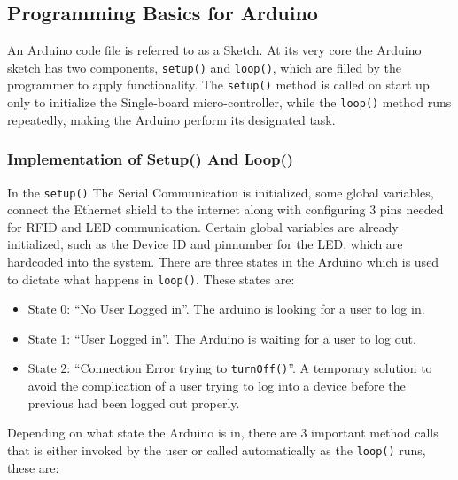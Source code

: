 \subsection{Programming Basics for Arduino}
\label{ProgrammingBasicsforArduino}

An Arduino code file is referred to as a Sketch. At its very core the Arduino sketch has two components, \verb|setup()| and \verb|loop()|, which are filled by the programmer to apply functionality.
The \verb|setup()| method is called on start up only to initialize the Single-board micro-controller, while the \verb|loop()| method runs repeatedly, making the Arduino perform its designated task.

\subsubsection*{Implementation of Setup() And Loop()}
In the \verb|setup()| The Serial Communication is initialized, some global variables, connect the Ethernet shield to the internet along with configuring 3 pins needed for RFID and LED communication. Certain global variables are already initialized, such as the Device ID and pinnumber for the LED, which are hardcoded into the system.\newline
There are three states in the Arduino which is used to dictate what happens in \verb|loop()|. These states are:
\begin{itemize}
	\item State 0: ``No User Logged in''. The arduino is looking for a user to log in.
	\item State 1: ``User Logged in''. The Arduino is waiting for a user to log out.
	\item State 2: ``Connection Error trying to \verb|turnOff()|''. A temporary solution to avoid the complication of a user trying to log into a device before the previous had been logged out properly.
\end{itemize}
Depending on what state the Arduino is in, there are 3 important method calls that is either invoked by the user or called automatically as the \verb|loop()| runs, these are:
